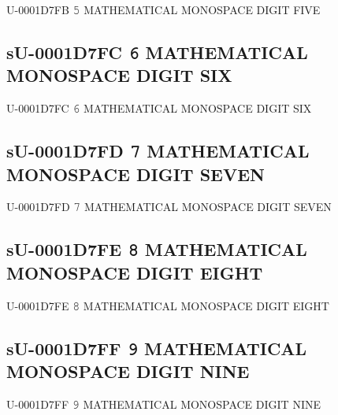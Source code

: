 U-0001D7FB 𝟻 MATHEMATICAL MONOSPACE DIGIT FIVE

\subsection{sU-0001D7FC 𝟼 MATHEMATICAL MONOSPACE DIGIT SIX}

U-0001D7FC 𝟼 MATHEMATICAL MONOSPACE DIGIT SIX

\subsection{sU-0001D7FD 𝟽 MATHEMATICAL MONOSPACE DIGIT SEVEN}

U-0001D7FD 𝟽 MATHEMATICAL MONOSPACE DIGIT SEVEN

\subsection{sU-0001D7FE 𝟾 MATHEMATICAL MONOSPACE DIGIT EIGHT}

U-0001D7FE 𝟾 MATHEMATICAL MONOSPACE DIGIT EIGHT

\subsection{sU-0001D7FF 𝟿 MATHEMATICAL MONOSPACE DIGIT NINE}

U-0001D7FF 𝟿 MATHEMATICAL MONOSPACE DIGIT NINE
